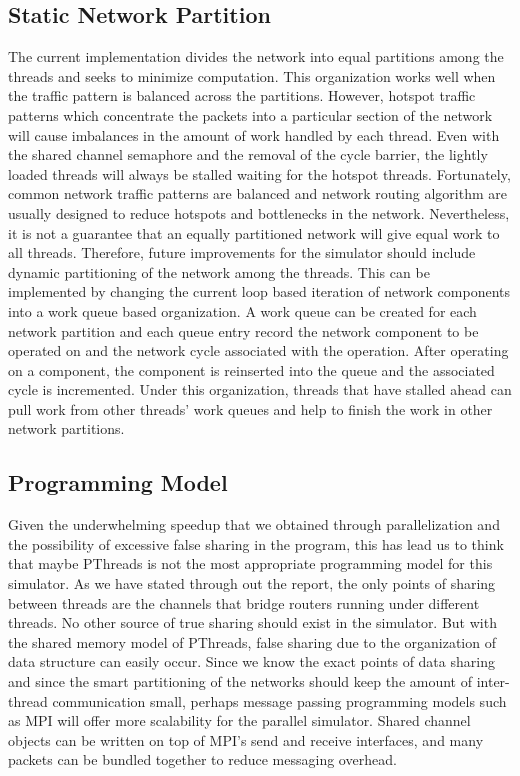 

\subsection{Static Network Partition}
The current implementation divides the network into equal partitions among the threads and seeks to minimize computation. This organization works well when the traffic pattern is balanced across the partitions. However, hotspot traffic patterns which concentrate the packets into a particular section of the network will cause imbalances in the amount of work handled by each thread. Even with the shared channel semaphore and the removal of the cycle barrier, the lightly loaded threads will  always be stalled waiting for the hotspot threads. Fortunately, common network traffic patterns are balanced and network routing algorithm are usually designed to reduce hotspots and bottlenecks in the network. Nevertheless, it is not a guarantee that an equally partitioned network will give equal work to all threads. Therefore, future improvements for the simulator should include dynamic partitioning of the network among the threads. This can be implemented by changing the current loop based iteration of network components into a work queue based organization. A work queue can be created for each network partition and each queue entry record the network component to be operated on and the network cycle associated with the operation. After operating on a component, the component is reinserted into the queue and the associated cycle is incremented. Under this organization, threads that have stalled ahead can pull work from other threads' work queues and help to finish the work in other network partitions.  

\subsection{Programming Model}
Given the underwhelming speedup that we obtained through parallelization and the possibility of excessive false sharing in the program, this has lead us to think that maybe PThreads is not the most appropriate programming model for this simulator. As we have stated through out the report, the only points of sharing between threads are the channels that bridge routers running under different threads. No other source of true sharing should exist in the simulator. But with the shared memory model of PThreads, false sharing due to the organization of data structure can easily occur. Since we know the exact points of data sharing and since the smart partitioning of the networks should keep the amount of inter-thread communication small, perhaps message passing programming models such as MPI will offer more scalability for the parallel simulator. Shared channel objects can be written on top of MPI's send and receive interfaces, and many packets can be bundled together to reduce messaging overhead. 
